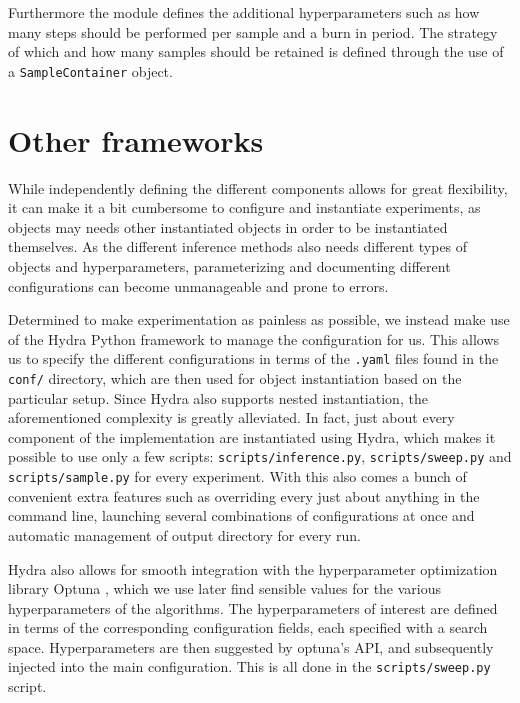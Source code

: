 Furthermore the module defines the additional hyperparameters such as how many steps should be performed per sample and a burn in period.
The strategy of which and how many samples should be retained is defined through the use of a \texttt{SampleContainer} object.

\section{Other frameworks}

While independently defining the different components allows for great flexibility, it can make it a bit cumbersome to configure and instantiate experiments, as objects may needs other instantiated objects in order to be instantiated themselves.
As the different inference methods also needs different types of objects and hyperparameters, parameterizing and documenting different configurations can become unmanageable and prone to errors.

Determined to make experimentation as painless as possible, we instead make use of the Hydra Python framework to manage the configuration for us.  
This allows us to specify the different configurations in terms of the \texttt{.yaml} files found in the \texttt{conf/} directory, which are then used for object instantiation based on the particular setup. 
Since Hydra also supports nested instantiation, the aforementioned complexity is greatly alleviated.
In fact, just about every component of the implementation are instantiated using Hydra, which makes it possible to use only a few scripts: \texttt{scripts/inference.py}, \texttt{scripts/sweep.py} and \texttt{scripts/sample.py} for every experiment. 
With this also comes a bunch of convenient extra features such as overriding every just about anything in the command line, launching several combinations of configurations at once and automatic management of output directory for every run.

Hydra also allows for smooth integration with the hyperparameter optimization library Optuna \cite{akiba_optuna_2019}, which we use later find sensible values for the various hyperparameters of the algorithms. 
The hyperparameters of interest are defined in terms of the corresponding configuration fields, each specified with a search space. 
Hyperparameters are then suggested by optuna's API, and subsequently injected into the main configuration. 
This is all done in the \texttt{scripts/sweep.py} script.
